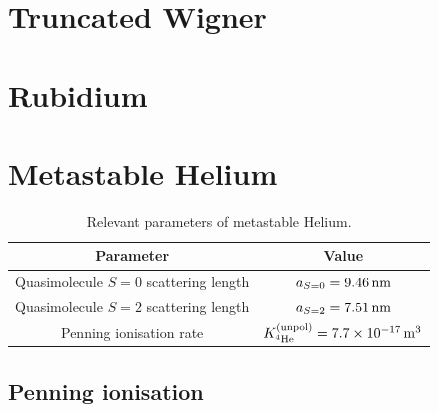 \section{Truncated Wigner}
\label{BackgroundTheory:TruncatedWigner}
\section{Rubidium}
\label{BackgroundTheory:Rubidium}
\section{Metastable Helium}
\label{BackgroundTheory:Helium}

\begin{table}
    \centering
    \begin{tabular}{cc}
    \toprule
    Parameter & Value\\
    \midrule
    Quasimolecule $S=0$ scattering length & $a_{S=0}=\unit[9.46]{nm}$\\
    Quasimolecule $S=2$ scattering length & $a_{S=2}=\unit[7.51]{nm}$\\
    Penning ionisation rate & $K^\text{(unpol)}_{^4\text{He}} = \unit[7.7\times 10^{-17}]{m\textsuperscript{3}}$\\
    \bottomrule
    \end{tabular}
    \caption{\label{BackgroundTheory:He*Parameters} Relevant parameters of metastable Helium.}
\end{table}

\subsection{Penning ionisation}

